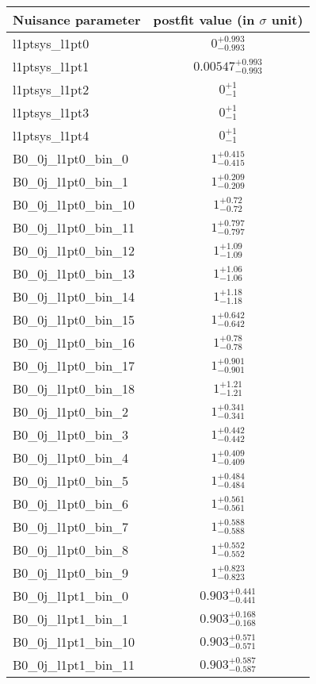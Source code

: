 
\begin{tabular}{|l|c|}
\hline
Nuisance parameter & postfit value (in $\sigma$ unit) \\\hline
l1ptsys\_l1pt0 & $0^{+0.993}_{-0.993}$ \\
l1ptsys\_l1pt1 & $0.00547^{+0.993}_{-0.993}$ \\
l1ptsys\_l1pt2 & $0^{+1}_{-1}$ \\
l1ptsys\_l1pt3 & $0^{+1}_{-1}$ \\
l1ptsys\_l1pt4 & $0^{+1}_{-1}$ \\
B0\_0j\_l1pt0\_bin\_0 & $1^{+0.415}_{-0.415}$ \\
B0\_0j\_l1pt0\_bin\_1 & $1^{+0.209}_{-0.209}$ \\
B0\_0j\_l1pt0\_bin\_10 & $1^{+0.72}_{-0.72}$ \\
B0\_0j\_l1pt0\_bin\_11 & $1^{+0.797}_{-0.797}$ \\
B0\_0j\_l1pt0\_bin\_12 & $1^{+1.09}_{-1.09}$ \\
B0\_0j\_l1pt0\_bin\_13 & $1^{+1.06}_{-1.06}$ \\
B0\_0j\_l1pt0\_bin\_14 & $1^{+1.18}_{-1.18}$ \\
B0\_0j\_l1pt0\_bin\_15 & $1^{+0.642}_{-0.642}$ \\
B0\_0j\_l1pt0\_bin\_16 & $1^{+0.78}_{-0.78}$ \\
B0\_0j\_l1pt0\_bin\_17 & $1^{+0.901}_{-0.901}$ \\
B0\_0j\_l1pt0\_bin\_18 & $1^{+1.21}_{-1.21}$ \\
B0\_0j\_l1pt0\_bin\_2 & $1^{+0.341}_{-0.341}$ \\
B0\_0j\_l1pt0\_bin\_3 & $1^{+0.442}_{-0.442}$ \\
B0\_0j\_l1pt0\_bin\_4 & $1^{+0.409}_{-0.409}$ \\
B0\_0j\_l1pt0\_bin\_5 & $1^{+0.484}_{-0.484}$ \\
B0\_0j\_l1pt0\_bin\_6 & $1^{+0.561}_{-0.561}$ \\
B0\_0j\_l1pt0\_bin\_7 & $1^{+0.588}_{-0.588}$ \\
B0\_0j\_l1pt0\_bin\_8 & $1^{+0.552}_{-0.552}$ \\
B0\_0j\_l1pt0\_bin\_9 & $1^{+0.823}_{-0.823}$ \\
B0\_0j\_l1pt1\_bin\_0 & $0.903^{+0.441}_{-0.441}$ \\
B0\_0j\_l1pt1\_bin\_1 & $0.903^{+0.168}_{-0.168}$ \\
B0\_0j\_l1pt1\_bin\_10 & $0.903^{+0.571}_{-0.571}$ \\
B0\_0j\_l1pt1\_bin\_11 & $0.903^{+0.587}_{-0.587}$ \\

\end{tabular}
